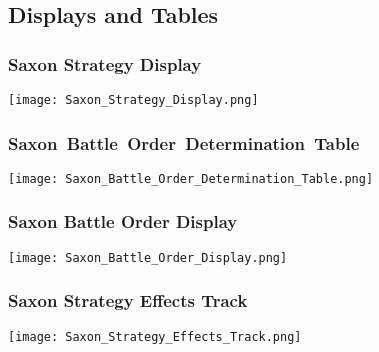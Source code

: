 \subsection{Displays and Tables}

\subsubsection{Saxon Strategy Display}

\begin{center}
  \begin{noverticalspace}
    \texttt{[image: Saxon\_Strategy\_Display.png]}
  \end{noverticalspace}
\end{center}

\subsubsection{\mbox{Saxon Battle Order Determination Table}}

\begin{center}
  \begin{noverticalspace}
    \texttt{[image: Saxon\_Battle\_Order\_Determination\_Table.png]}
  \end{noverticalspace}
\end{center}

\subsubsection{Saxon Battle Order Display}

\begin{center}
  \begin{noverticalspace}
    \texttt{[image: Saxon\_Battle\_Order\_Display.png]}
  \end{noverticalspace}
\end{center}

\subsubsection{Saxon Strategy Effects Track}

\begin{center}
  \begin{noverticalspace}
    \texttt{[image: Saxon\_Strategy\_Effects\_Track.png]}
  \end{noverticalspace}
\end{center}

